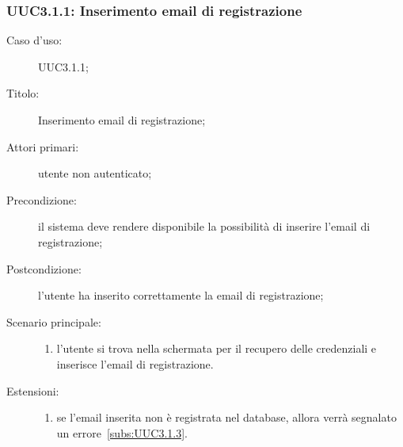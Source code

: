 \documentclass[../../../analisi-dei-requisiti.tex]{subfiles}
\begin{document}
\subsubsection{UUC3.1.1: Inserimento email di registrazione}%
\label{subs:UUC3.1.1}
\begin{description}
  \item[Caso d’uso:] UUC3.1.1;
  \item[Titolo:] Inserimento email di registrazione;
  \item[Attori primari:] utente non autenticato;
  \item[Precondizione:] il sistema deve rendere disponibile la possibilità di inserire l'email di registrazione;
  \item[Postcondizione:] l'utente ha inserito correttamente la email di registrazione;
  \item[Scenario principale:]
        \begin{enumerate}
          \item l'utente si trova nella schermata per il recupero delle credenziali e inserisce l'email di registrazione.
        \end{enumerate}
  \item[Estensioni:]
        \begin{enumerate}
          \item se l'email inserita non è registrata nel database, allora verrà segnalato un errore~\ref{subs:UUC3.1.3}.
        \end{enumerate}
\end{description}
\end{document}
